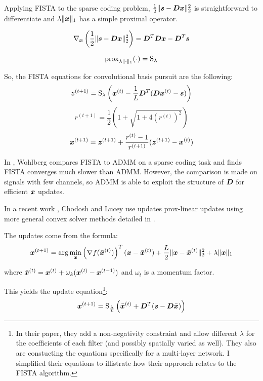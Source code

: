 Applying FISTA to the sparse coding problem, $\frac{1}{2}\|\bm{s} - \bm{D}\bm{x}\|_2^2$ is straightforward to differentiate and $\lambda\|\bm{x}\|_1$ has a simple proximal operator.

\begin{equation}
\nabla_{\bm{x}}\left(\frac{1}{2}\|\bm{s} - \bm{D}\bm{x}\|_2^2\right) = \bm{D}^T\bm{D}\bm{x} - \bm{D}^T\bm{s}
\end{equation}

\begin{equation}
\operatorname{prox}_{\lambda\|\cdot\|_1}(\cdot) = \operatorname{S}_{\lambda}
\end{equation}

So, the FISTA equations for convolutional basis pursuit are the following:
\begin{equation}
\bm{z}^{(t + 1)} = \operatorname{S}_{\lambda}\left(\bm{x}^{(t)} - \frac{1}{L}\bm{D}^T(\bm{D}\bm{x}^{(t)} - \bm{s})\right)
\end{equation}
\begin{equation}
r^{(t + 1)} = \frac{1}{2}\left(1 + \sqrt{1 + 4(r^{(t)})^2}\right)
\end{equation}
\begin{equation}
\bm{x}^{(t + 1)} = \bm{z}^{(t + 1)} + \frac{r^{(t)} - 1}{r^{(t + 1)}}(\bm{z}^{(t + 1)} - \bm{x}^{(t)})
\end{equation}

In \cite{wohlberg2015efficient}, Wohlberg compares FISTA to ADMM on a sparse coding task and finds FISTA converges much slower than ADMM. However, the comparison is made on signals with few channels, so ADMM is able to exploit the structure of $\bm{D}$ for efficient $\bm{x}$ updates.

In a recent work \cite{chodosh2020use}, Chodosh and Lucey use updates prox-linear updates using more general convex solver methods detailed in \cite{xu2013block}.

The updates come from the formula:
\begin{equation}
\bm{x}^{(t + 1)} = \arg\min_{\bm{x}} \left(\nabla f(\bar{\bm{x}}^{(t)})\right)^T(\bm{x} - \bar{\bm{x}}^{(t)}) + \frac{L}{2}\|\bm{x} - \bar{\bm{x}}^{(t)}\|_2^2 + \lambda\|\bm{x}\|_1
\end{equation}

where $\bar{\bm{x}}^{(t)} = \bm{x}^{(t)} + \omega_k(\bm{x}^{(t)} - \bm{x}^{(t - 1)})$ and $\omega_t$ is a momentum factor.

This yields the update equation\footnote{In their paper, they add a non-negativity constraint and allow different $\lambda$ for the coefficients of each filter (and possibly spatially varied as well). They also are constucting the equations specifically for a multi-layer network. I simplified their equations to illistrate how their approach relates to the FISTA algorithm.}:
\begin{equation}
\bm{x}^{(t + 1)} = \operatorname{S}_{\frac{\lambda}{L}}\left(\bar{\bm{x}}^{(t)} + \bm{D}^T(\bm{s} - \bm{D}\bar{\bm{x}})\right)
\end{equation}

